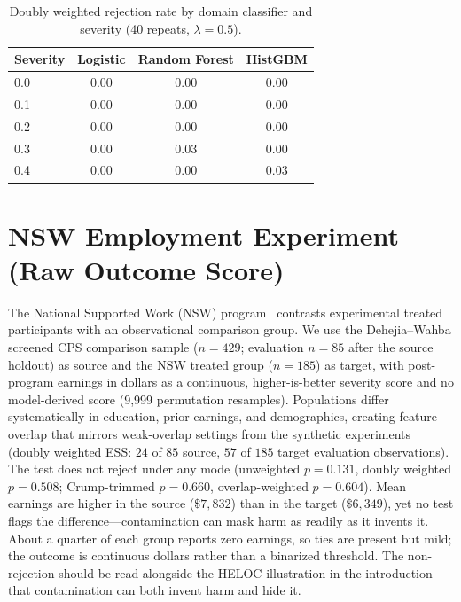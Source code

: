 \begin{table}[t]
	\centering
	\caption{Doubly weighted rejection rate by domain classifier and severity (40 repeats, $\lambda = 0.5$).}
	\label{tab:domain-clf-sensitivity}
	\footnotesize
	\begin{tabular}{l c c c}
		\toprule
		Severity & Logistic & Random Forest & HistGBM \\
		\midrule
		0.0 & 0.00 & 0.00 & 0.00 \\
		0.1 & 0.00 & 0.00 & 0.00 \\
		0.2 & 0.00 & 0.00 & 0.00 \\
		0.3 & 0.00 & 0.03 & 0.00 \\
		0.4 & 0.00 & 0.00 & 0.03 \\
		\bottomrule
	\end{tabular}
\end{table}

\section{NSW Employment Experiment (Raw Outcome Score)}\label{app:nsw}

The National Supported Work (NSW) program~\cite{LaLonde_1986} contrasts experimental treated participants with an observational comparison group. We use the Dehejia--Wahba screened CPS comparison sample ($n=429$; evaluation $n=85$ after the source holdout) as source and the NSW treated group ($n=185$) as target, with post-program earnings in dollars as a continuous, higher-is-better severity score and no model-derived score (9,999 permutation resamples). Populations differ systematically in education, prior earnings, and demographics, creating feature overlap that mirrors weak-overlap settings from the synthetic experiments (doubly weighted ESS: $24$ of $85$ source, $57$ of $185$ target evaluation observations). The test does not reject under any mode (unweighted $p=0.131$, doubly weighted $p=0.508$; Crump-trimmed $p=0.660$, overlap-weighted $p=0.604$). Mean earnings are higher in the source ($\$7{,}832$) than in the target ($\$6{,}349$), yet no test flags the difference---contamination can mask harm as readily as it invents it. About a quarter of each group reports zero earnings, so ties are present but mild; the outcome is continuous dollars rather than a binarized threshold. The non-rejection should be read alongside the HELOC illustration in the introduction that contamination can both invent harm and hide it.
